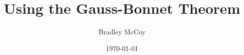 \documentclass[10pt]{article}
\title{Using the Gauss-Bonnet Theorem}
\author{Bradley McCoy}
\date{\today}
\begin{document}
\maketitle \tableofcontents 




%




{
\small

%

}
\end{document}
